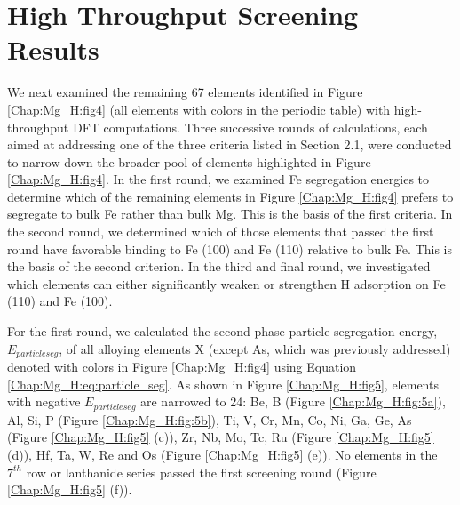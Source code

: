 \section{High Throughput Screening Results}

We next examined the remaining 67 elements identified in Figure \ref{Chap:Mg_H:fig4} (all elements with colors in the periodic table) with high-throughput DFT computations. Three successive rounds of calculations, each aimed at addressing one of the three criteria listed in Section 2.1, were conducted to narrow down the broader pool of elements highlighted in Figure \ref{Chap:Mg_H:fig4}. In the first round, we examined Fe segregation energies to determine which of the remaining elements in Figure \ref{Chap:Mg_H:fig4} prefers to segregate to bulk Fe rather than bulk Mg. This is the basis of the first criteria. In the second round, we determined which of those elements that passed the first round have favorable binding to Fe (100) and Fe (110) relative to bulk Fe. This is the basis of the second criterion. In the third and final round, we investigated which elements can either significantly weaken or strengthen H adsorption on Fe (110) and Fe (100).


For the first round, we calculated the second-phase particle segregation energy, $E_{particle seg}$,  of all alloying elements X (except As, which was previously addressed) denoted with colors in Figure \ref{Chap:Mg_H:fig4} using Equation \ref{Chap:Mg_H:eq:particle_seg}. As shown in Figure \ref{Chap:Mg_H:fig5}, elements with negative $E_{particle seg}$ are narrowed to 24: Be, B (Figure \ref{Chap:Mg_H:fig:5a}), Al, Si, P (Figure \ref{Chap:Mg_H:fig:5b}), Ti, V, Cr, Mn, Co, Ni, Ga, Ge, As (Figure \ref{Chap:Mg_H:fig5} (c)), Zr, Nb, Mo, Tc, Ru (Figure \ref{Chap:Mg_H:fig5} (d)), Hf, Ta, W, Re and Os (Figure \ref{Chap:Mg_H:fig5} (e)). No elements in the $7^{th}$ row or lanthanide series passed the first screening round (Figure \ref{Chap:Mg_H:fig5} (f)).


